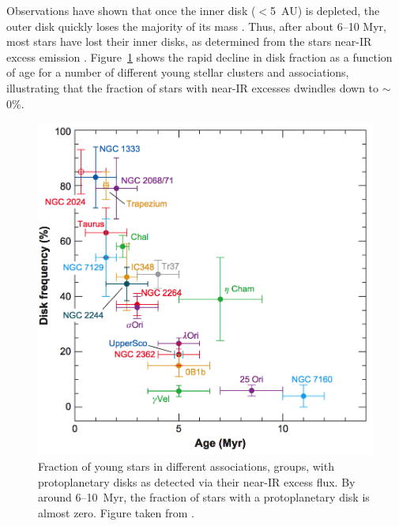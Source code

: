     Observations have shown that once the inner disk ($<$5~AU) is depleted, the outer disk quickly loses the majority of its mass \citep{Williams2011}. Thus, after about 6--10 Myr, most stars have lost their inner disks, as determined from the stars near-IR excess emission \citep{Wyatt2008}. Figure~\ref{fig:ppd_near_irexcess} shows the rapid decline in disk fraction as a function of age for a number of different young stellar clusters and associations, illustrating that the fraction of stars with near-IR excesses dwindles down to $\sim$0\%. 
    
    \begin{figure}
    \centering
    \includegraphics[width=\textwidth]{Ch1/diskfraction_vs_age_wyatt2008}
    \caption[Protoplanetary Disk Fraction Evolution]{Fraction of young stars in different associations, groups, with protoplanetary disks as detected via their near-IR excess flux. By around 6--10~Myr, the fraction of stars with a protoplanetary disk is almost zero. Figure taken from \citet{Wyatt2008}.}
    \label{fig:ppd_near_irexcess}
    \end{figure}
    
